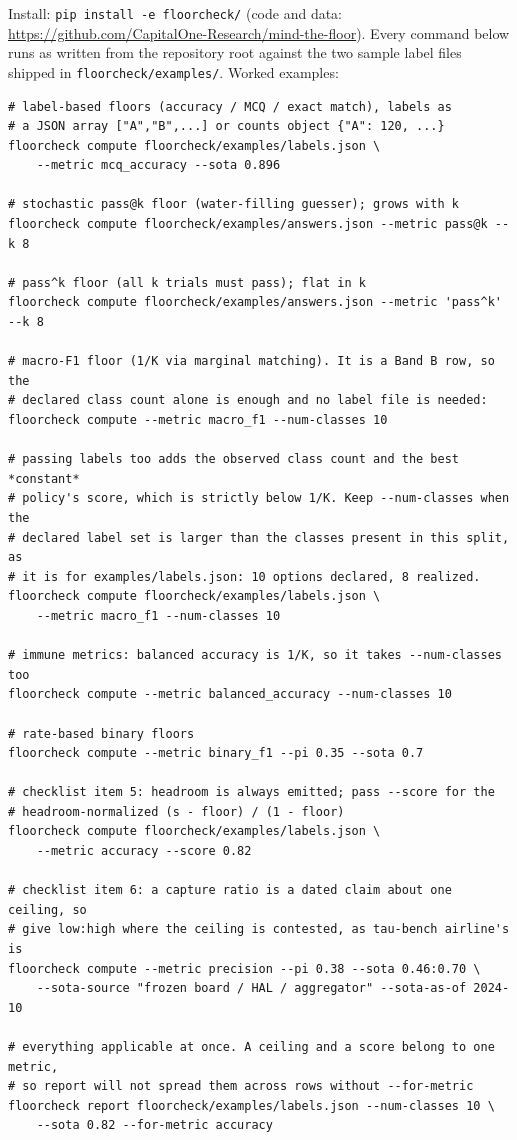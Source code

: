 \documentclass{article}
\theoremstyle{plain}
\theoremstyle{definition}
\begin{document}
Install: \texttt{pip install -e floorcheck/} (code and data: \url{https://github.com/CapitalOne-Research/mind-the-floor}). Every command below runs as written from the repository root against the two sample label files shipped in \texttt{floorcheck/examples/}. Worked examples:
\begin{verbatim}
# label-based floors (accuracy / MCQ / exact match), labels as
# a JSON array ["A","B",...] or counts object {"A": 120, ...}
floorcheck compute floorcheck/examples/labels.json \
    --metric mcq_accuracy --sota 0.896

# stochastic pass@k floor (water-filling guesser); grows with k
floorcheck compute floorcheck/examples/answers.json --metric pass@k --k 8

# pass^k floor (all k trials must pass); flat in k
floorcheck compute floorcheck/examples/answers.json --metric 'pass^k' --k 8

# macro-F1 floor (1/K via marginal matching). It is a Band B row, so the
# declared class count alone is enough and no label file is needed:
floorcheck compute --metric macro_f1 --num-classes 10

# passing labels too adds the observed class count and the best *constant*
# policy's score, which is strictly below 1/K. Keep --num-classes when the
# declared label set is larger than the classes present in this split, as
# it is for examples/labels.json: 10 options declared, 8 realized.
floorcheck compute floorcheck/examples/labels.json \
    --metric macro_f1 --num-classes 10

# immune metrics: balanced accuracy is 1/K, so it takes --num-classes too
floorcheck compute --metric balanced_accuracy --num-classes 10

# rate-based binary floors
floorcheck compute --metric binary_f1 --pi 0.35 --sota 0.7

# checklist item 5: headroom is always emitted; pass --score for the
# headroom-normalized (s - floor) / (1 - floor)
floorcheck compute floorcheck/examples/labels.json \
    --metric accuracy --score 0.82

# checklist item 6: a capture ratio is a dated claim about one ceiling, so
# give low:high where the ceiling is contested, as tau-bench airline's is
floorcheck compute --metric precision --pi 0.38 --sota 0.46:0.70 \
    --sota-source "frozen board / HAL / aggregator" --sota-as-of 2024-10

# everything applicable at once. A ceiling and a score belong to one metric,
# so report will not spread them across rows without --for-metric
floorcheck report floorcheck/examples/labels.json --num-classes 10 \
    --sota 0.82 --for-metric accuracy
\end{verbatim}
\end{document}
